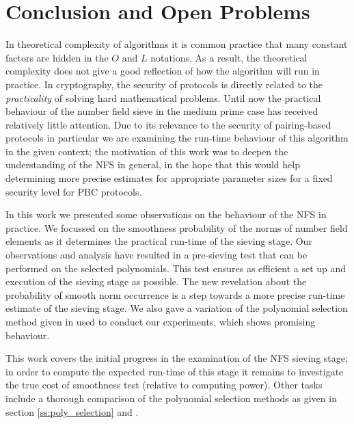 \documentclass[a4paper, 10pt, envcountsect, runningheads]{article}
\numberwithin{figure}{section}
\numberwithin{equation}{section}
\begin{document}
\section{Conclusion and Open Problems}
\label{s:conclusion}
In theoretical complexity of algorithms it is common practice that many constant factors are hidden in the $O$ and $L$ notations. As a result, the theoretical complexity does not give a good reflection of how the algorithm will run in practice.  
In cryptography, the security of protocols is directly related to the {\em practicality} of solving hard mathematical problems. Until now the practical behaviour of the number field sieve in the medium prime case has received relatively little attention. Due to its relevance to the security of pairing-based protocols in particular we are examining the run-time behaviour of this algorithm in the given context; the motivation of this work was to deepen the understanding of the NFS in general, in the hope that this would help determining more precise estimates for appropriate parameter sizes for a fixed security level for PBC protocols. 

In this work we presented some observations on the behaviour of the NFS in practice. We focussed on the smoothness probability of the norms of number field elements as it determines the practical run-time of the sieving stage. Our observations and analysis have resulted in a pre-sieving test that can be performed on the selected polynomials. This test ensures as efficient a set up and execution of the sieving stage as possible. The new revelation about the probability of smooth norm occurrence is a step towards a more precise run-time estimate of the sieving stage. We also gave a variation of the polynomial selection method given in \cite{joux-lercier-smart-vercauteren06} used to conduct our experiments, which shows promising behaviour.

This work covers the initial progress in the examination of the NFS sieving stage; in order to compute the expected run-time of this stage it remains to investigate the true cost of smoothness test (relative to computing power). Other tasks include a thorough comparison of the polynomial selection methods as given in section \ref{ss:poly_selection} and \cite{joux-lercier-smart-vercauteren06}. 




\newpage
\appendix
\end{document}

